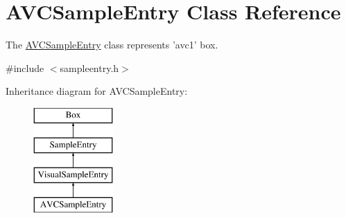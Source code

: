 \hypertarget{class_a_v_c_sample_entry}{\section{A\-V\-C\-Sample\-Entry Class Reference}
\label{class_a_v_c_sample_entry}
}


The \hyperlink{class_a_v_c_sample_entry}{A\-V\-C\-Sample\-Entry} class represents 'avc1' box.  




{\ttfamily \#include $<$sampleentry.\-h$>$}

Inheritance diagram for A\-V\-C\-Sample\-Entry\-:\begin{figure}[H]
\begin{center}
\leavevmode
\includegraphics[height=4.000000cm]{class_a_v_c_sample_entry}
\end{center}
\end{figure}
